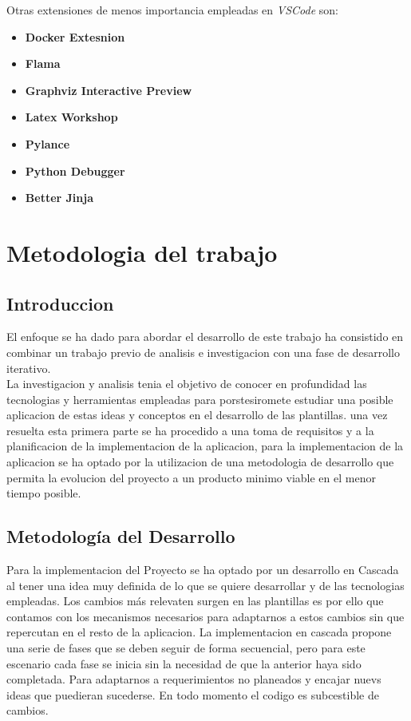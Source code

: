 \documentclass[12pt, a4paper, twoside]{article}
\begin{document}
Otras extensiones de menos importancia empleadas en \textit{VSCode} son:
\begin{itemize}
    \item \textbf{Docker Extesnion}
    \item \textbf{Flama}
    \item \textbf{Graphviz Interactive Preview}
    \item \textbf{Latex Workshop}
    \item \textbf{Pylance}
    \item \textbf{Python Debugger}
    \item \textbf{Better Jinja}
\end{itemize}














\section{Metodologia del trabajo}
\label{sec:Metodologia}
\subsection{Introduccion}
El enfoque se ha dado para abordar el desarrollo de este trabajo ha consistido en combinar un trabajo previo de analisis e investigacion con una fase de desarrollo iterativo.
\\La investigacion y analisis tenia el objetivo de conocer en profundidad las tecnologias y herramientas empleadas 
para porstesiromete estudiar una posible aplicacion de estas ideas y conceptos en el desarrollo de las plantillas.
una vez resuelta esta primera parte se ha procedido a una toma de requisitos y a la planificacion de la implementacion de la aplicacion,
para la implementacion de la aplicacion se ha optado por la utilizacion de una metodologia de desarrollo que permita la evolucion del proyecto a un producto minimo viable en el menor tiempo posible.
\subsection{Metodología del Desarrollo}
Para la implementacion del Proyecto se ha optado por un desarrollo en Cascada al tener una idea muy definida de lo que se quiere desarrollar y de las tecnologias empleadas.
Los cambios más relevaten surgen en las plantillas es por ello que contamos con los mecanismos necesarios para adaptarnos a estos cambios sin que repercutan en el resto de la aplicacion.
La implementacion en cascada propone una serie de fases que se deben seguir de forma secuencial, pero para este escenario cada fase se inicia sin la necesidad de que la anterior haya sido completada.
Para adaptarnos a requerimientos no planeados y encajar nuevs ideas que puedieran sucederse. En todo momento el codigo es subcestible de cambios.
\end{document}
